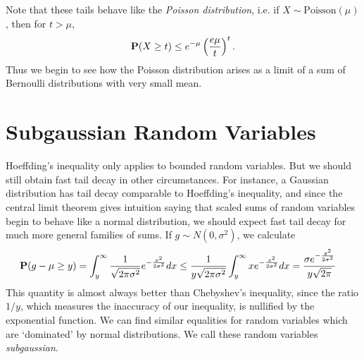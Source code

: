 Note that these tails behave like the \emph{Poisson distribution}, i.e. if $X \sim \text{Poisson}(\mu)$, then for $t > \mu$,
%
\[ \operatorname{\mathbf{P}}(X \geq t) \leq e^{-\mu} \left( \frac{e \mu}{t} \right)^t. \]
%
Thus we begin to see how the Poisson distribution arises as a limit of a sum of Bernoulli distributions with very small mean.

\section{Subgaussian Random Variables}

Hoeffding's inequality only applies to bounded random variables. But we should still obtain fast tail decay in other circumstances. For instance, a Gaussian distribution has tail decay comparable to Hoeffding's inequality, and since the central limit theorem gives intuition saying that scaled sums of random variables begin to behave like a normal distribution, we should expect fast tail decay for much more general families of sums. If $g \sim N(0,\sigma^2)$, we calculate
%
\begin{align*}
    \operatorname{\mathbf{P}}(g - \mu \geq y) &= \int_{y}^\infty \frac{1}{\sqrt{2 \pi \sigma^2}} e^{-\frac{x^2}{2 \sigma^2}} dx \leq \frac{1}{y \sqrt{2 \pi \sigma^2}} \int_{y}^\infty x e^{- \frac{x^2}{2\sigma^2}} dx = \frac{\sigma e^{- \frac{y^2}{2 \sigma^2}}}{y \sqrt{2 \pi}}
\end{align*}
%
This quantity is almost always better than Chebyshev's inequality, since the ratio $1/y$, which measures the inaccuracy of our inequality, is nullified by the exponential function. We can find similar equalities for random variables which are `dominated' by normal distributions. We call these random variables \emph{subgaussian}.


